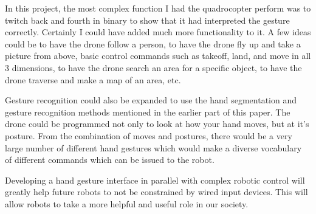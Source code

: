 \documentclass[a4paper,12pt]{report}
\begin{document}
In this project, the most complex function I had the quadrocopter perform was to twitch back and fourth in binary to show that it had interpreted the gesture correctly. Certainly I could have added much more functionality to it. A few ideas could be to have the drone follow a person, to have the drone fly up and take a picture from above, basic control commands such as takeoff, land, and move in all 3 dimensions, to have the drone search an area for a specific object, to have the drone traverse and make a map of an area, etc. 

Gesture recognition could also be expanded to use the hand segmentation and gesture recognition methods mentioned in the earlier part of this paper. The drone could be programmed not only to look at how your hand moves, but at it's posture. From the combination of moves and postures, there would be a very large number of different hand gestures which would make a diverse vocabulary of different commands which can be issued to the robot.   

Developing a hand gesture interface in parallel with complex robotic control will greatly help future robots to not be constrained by wired input devices. This will allow robots to take a more helpful and useful role in our society. 








\end{document}
